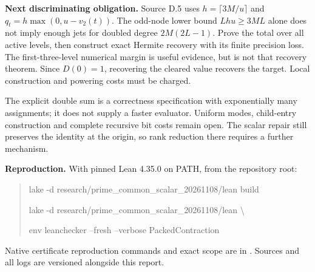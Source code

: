 \documentclass[11pt]{article}
\begin{document}
\textbf{Next discriminating obligation.}
Source D.5 uses $h=\lceil3M/u\rceil$ and
$q_t=h\max(0,u-v_2(t))$. The odd-node lower bound $Lhu\geq3ML$ alone does
not imply enough jets for doubled degree $2M(2L-1)$. Prove the total over
all active levels, then construct exact Hermite recovery with its finite
precision loss. The first-three-level numerical margin is useful evidence,
but is not that recovery theorem. Since $D(0)=1$, recovering the cleared value
recovers the target. Local construction and powering costs must be charged.

The explicit double sum is a correctness specification with exponentially
many assignments; it does not supply a faster evaluator. Uniform modes,
child-entry construction and complete recursive bit costs remain open.
The scalar repair still preserves the identity at the origin, so rank reduction
there requires a further mechanism.

\textbf{Reproduction.}
With pinned Lean 4.35.0 on PATH, from the repository root:
\begin{quote}\small\ttfamily
lake -d research/prime\_common\_scalar\_20261108/lean build\par
lake -d research/prime\_common\_scalar\_20261108/lean \textbackslash\par
\quad env leanchecker --fresh --verbose PackedContraction
\end{quote}
Native certificate reproduction commands and exact scope are in
. Sources and all logs are versioned alongside this report.
\end{document}
